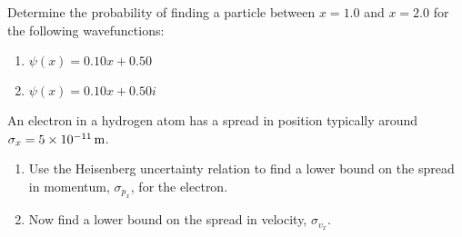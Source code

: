 
\begin{problem}
Determine the probability of finding a particle between $x = 1.0$ and
$x = 2.0$ for the following wavefunctions:
\begin{enumerate}
\item $\psi(x) = 0.10x+0.50$
%
%
\item $\psi(x) = 0.10x+0.50i$
%
\end{enumerate}
\label{prob:WavefunctionProbs}
\end{problem}

% 
% 
%


\begin{problem}
  An electron in a hydrogen atom has a spread in position typically 
  around $\sigma_x = 5\times 10^{-11}\,\mbox{m}$.
  \begin{enumerate}
  \item Use the Heisenberg uncertainty relation to find a lower bound
    on the spread in momentum, $\sigma_{p_x}$, for the electron.

  \item Now find a lower bound on the spread in velocity, $\sigma_{v_x}$.

  \end{enumerate}
\label{prob:UncertaintyHelectron}
\end{problem}

